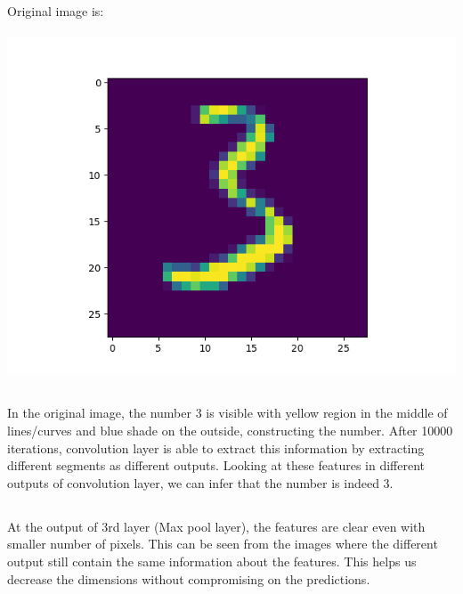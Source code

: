 \documentclass[fleqn]{article}
\begin{document}
\section{}
	Original image is:	 \\ \\
	\includegraphics[scale = 1]{original_image.png}\\ 
\subsection{}
	\begin{adjustwidth}{4em}{0pt}
		In the original image, the number 3 is visible with yellow region in the middle of lines/curves and blue shade on the outside, constructing the number. After 10000 iterations, convolution layer is able to extract this information by extracting different segments as different outputs. Looking at these features in different outputs of convolution layer, we can infer that the number is indeed 3. \\	
	\end{adjustwidth}

\subsection{}
	\begin{adjustwidth}{4em}{0pt}
		At the output of 3rd layer (Max pool layer), the features are clear even with smaller number of pixels. This can be seen from the images where the different output still contain the same information about the features. This helps us decrease the dimensions without compromising on the predictions. \\	
	\end{adjustwidth}
	
\end{document}

